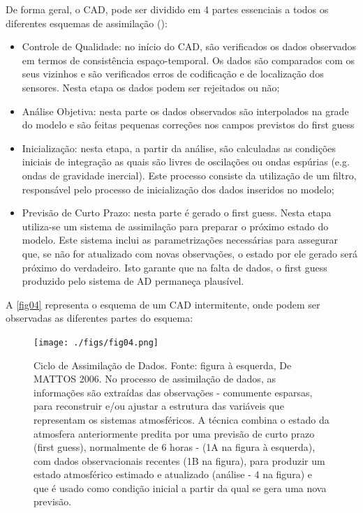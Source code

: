 De forma geral, o CAD, pode ser dividido em 4 partes essenciais a todos os diferentes esquemas de assimilação (\cite{nowosad2001}):

\begin{itemize}
\item Controle de Qualidade: no início do CAD, são verificados os dados observados em termos de consistência espaço-temporal. Os dados são comparados com os seus vizinhos e são verificados erros de codificação e de localização dos sensores. Nesta etapa os dados podem ser rejeitados ou não;
\item Análise Objetiva: nesta parte os dados observados são interpolados na grade do modelo e são feitas pequenas correções nos campos previstos do first guess
\item Inicialização: nesta etapa, a partir da análise, são calculadas as condições iniciais de integração as quais são livres de oscilações ou ondas espúrias (e.g. ondas de gravidade inercial). Este processo consiste da utilização de um filtro, responsável pelo processo de inicialização  dos dados inseridos no modelo;
\item Previsão de Curto Prazo: nesta parte é gerado o first guess. Nesta etapa utiliza-se um sistema de assimilação para preparar o próximo estado do modelo. Este sistema inclui as parametrizações necessárias para assegurar que, se não for atualizado com novas observações, o estado por ele gerado será próximo do verdadeiro. Isto garante que na falta de dados, o first guess produzido pelo sistema de AD permaneça plausível.
\end{itemize}

A \autoref{fig04} representa o esquema de um CAD intermitente, onde podem ser observadas as diferentes partes do esquema:

\begin{figure}
\centering
\texttt{[image: ./figs/fig04.png]}
\caption{Ciclo de Assimilação de Dados. Fonte: figura à esquerda, De MATTOS 2006. No processo de assimilação de dados, as informações são extraídas das observações - comumente esparsas, para reconstruir e/ou ajustar a estrutura das variáveis que representam os sistemas atmosféricos. A técnica combina o estado da atmosfera anteriormente predita por uma previsão de curto prazo (first guess), normalmente de 6 horas - (1A na figura à esquerda), com dados observacionais recentes (1B na figura), para produzir um estado atmosférico estimado e atualizado (análise - 4 na figura) e que é usado como condição inicial a partir da qual se gera uma nova previsão.}
\label{fig04}
\end{figure}

